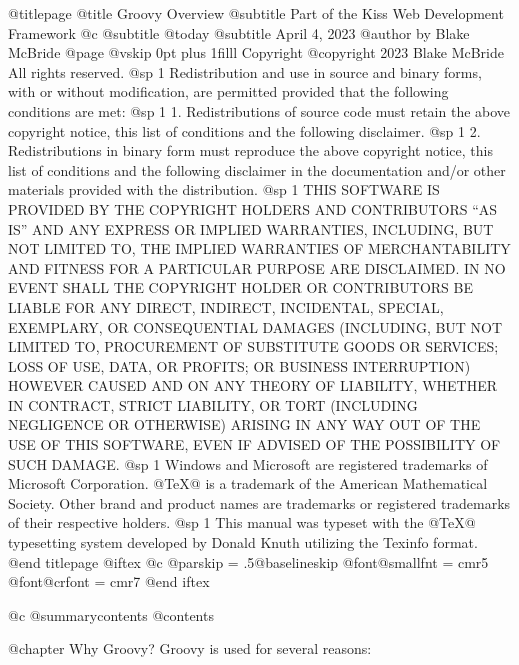 @titlepage
@title Groovy Overview
@subtitle Part of the Kiss Web Development Framework
@c @subtitle @today{}
@subtitle April 4, 2023
@author by Blake McBride
@page
@vskip 0pt plus 1filll
Copyright  @copyright{} 2023 Blake McBride
All rights reserved.
@sp 1
Redistribution and use in source and binary forms, with or without
modification, are permitted provided that the following conditions are
met:
@sp 1
1. Redistributions of source code must retain the above copyright
notice, this list of conditions and the following disclaimer.
@sp 1
2. Redistributions in binary form must reproduce the above copyright
notice, this list of conditions and the following disclaimer in the
documentation and/or other materials provided with the distribution.
@sp 1
THIS SOFTWARE IS PROVIDED BY THE COPYRIGHT HOLDERS AND CONTRIBUTORS
``AS IS'' AND ANY EXPRESS OR IMPLIED WARRANTIES, INCLUDING, BUT NOT
LIMITED TO, THE IMPLIED WARRANTIES OF MERCHANTABILITY AND FITNESS FOR
A PARTICULAR PURPOSE ARE DISCLAIMED. IN NO EVENT SHALL THE COPYRIGHT
HOLDER OR CONTRIBUTORS BE LIABLE FOR ANY DIRECT, INDIRECT, INCIDENTAL,
SPECIAL, EXEMPLARY, OR CONSEQUENTIAL DAMAGES (INCLUDING, BUT NOT
LIMITED TO, PROCUREMENT OF SUBSTITUTE GOODS OR SERVICES; LOSS OF USE,
DATA, OR PROFITS; OR BUSINESS INTERRUPTION) HOWEVER CAUSED AND ON ANY
THEORY OF LIABILITY, WHETHER IN CONTRACT, STRICT LIABILITY, OR TORT
(INCLUDING NEGLIGENCE OR OTHERWISE) ARISING IN ANY WAY OUT OF THE USE
OF THIS SOFTWARE, EVEN IF ADVISED OF THE POSSIBILITY OF SUCH DAMAGE.
@sp 1
Windows and Microsoft are registered trademarks of
Microsoft Corporation.  @TeX{}@ is a trademark of the American
Mathematical Society. Other brand and product names are trademarks or
registered trademarks of their respective holders.
@sp 1
This manual was typeset with the @TeX{}@ typesetting system developed by
Donald Knuth utilizing the Texinfo format.
@end titlepage
@iftex
@c @parskip = .5@baselineskip
@font@smallfnt = cmr5
@font@crfont = cmr7
@end iftex

@c @summarycontents
@contents

@chapter Why Groovy?
Groovy is used for several reasons:

